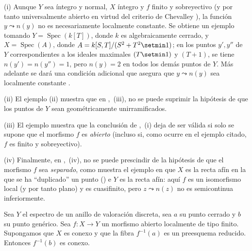\begin{remarks}[15.5.5]
\label{IV.15.5.5}
(i)
Aunque $Y$ sea íntegro y normal, $X$ íntegro y $f$ finito y sobreyectivo (y por tanto universalmente abierto en virtud del criterio de Chevalley ), la función $y\leadsto n(y)$ no es necesariamente localmente constante.
Se obtiene un ejemplo tomando $Y=\operatorname{Spec}(k[T])$, donde $k$ es algebraicamente cerrado, y $X=\operatorname{Spec}(A)$, donde $A=k[S,T]/(S^2+T^2\setmin 1)$; en los puntos $y',y''$ de $Y$ correspondientes a los ideales maximales $(T\setmin 1)$ y $(T+1)$, se tiene $n(y')=n(y'')=1$, pero $n(y)=2$ en todos los demás puntos de $Y$.
Más adelante se dará una condición adicional que asegura que $y\leadsto n(y)$ sea localmente constante .

(ii)
El ejemplo  (ii) muestra que en ,~(iii), no se puede suprimir la hipótesis de que los puntos de $Y$ sean geométricamente unirramificados.

(iii)
El ejemplo  muestra que la conclusión de ,~(i) deja de ser válida si solo se supone que el morfismo $f$ es \emph{abierto} (incluso si, como ocurre en el ejemplo citado, $f$ es finito y sobreyectivo).

(iv)
Finalmente, en ,~(iv), no se puede prescindir de la hipótesis de que el morfismo $f$ sea \emph{separado}, como muestra el ejemplo en que $X$ es la recta afín en la que se ha ``duplicado'' un punto () e $Y$ es la recta afín: aquí $f$ es un isomorfismo local (y por tanto plano) y es cuasifinito, pero $z\leadsto n(z)$ no es semicontinua inferiormente.
\end{remarks}

\begin{lemma}[15.5.6]
\label{IV.15.5.6}
Sea $Y$ el espectro de un anillo de valoración discreta, sea $a$ su punto cerrado y $b$ su punto genérico.
Sea $f:X\to Y$ un morfismo abierto localmente de tipo finito.
Supongamos que $X$ es conexo y que la fibra $f^{-1}(a)$ es un preesquema reducido.
Entonces $f^{-1}(b)$ es conexo.
\end{lemma}

